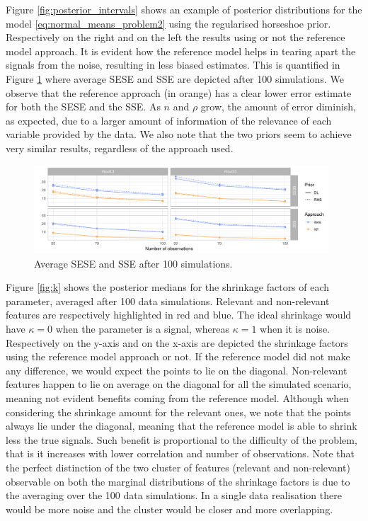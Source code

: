 \documentclass[american,]{article}
\theoremstyle{definition}
\begin{document}
Figure \ref{fig:posterior_intervals} shows an example of posterior distributions for the model \eqref{eq:normal_means_problem2} using the regularised horseshoe prior. Respectively on the right and on the left the results using or not the reference model approach. It is evident how the reference model helps in tearing apart the signals from the noise, resulting in less biased estimates. This is quantified in Figure \ref{fig:SESE_SSE} where average SESE and SSE are depicted after 100 simulations. We observe that the reference approach (in orange) has a clear lower error estimate for both the SESE and the SSE. As $n$ and $\rho$ grow, the amount of error diminish, as expected, due to a larger amount of information of the relevance of each variable provided by the data. We also note that the two priors seem to achieve very similar results, regardless of the approach used.

\begin{figure}[tp]
  \centering
  \includegraphics[width=0.98\textwidth]{graphics/SESE_SSE.pdf}
  \caption{Average SESE and SSE after 100 simulations.\\}
  \label{fig:SESE_SSE}
\end{figure}

Figure \ref{fig:k} shows the posterior medians for the shrinkage factors of each parameter, averaged after 100 data simulations. Relevant and non-relevant features are respectively highlighted in red and blue. The ideal shrinkage would have $\kappa=0$ when the parameter is a signal, whereas $\kappa=1$ when it is noise. Respectively on the y-axis and on the x-axis are depicted the shrinkage factors using the reference model approach or not. If the reference model did not make any difference, we would expect the points to lie on the diagonal. Non-relevant features happen to lie on average on the diagonal for all the simulated scenario, meaning not evident benefits coming from the reference model. Although when considering the shrinkage amount for the relevant ones, we note that the points always lie under the diagonal, meaning that the reference model is able to shrink less the true signals. Such benefit is proportional to the difficulty of the problem, that is it increases with lower correlation and number of observations. Note that the perfect distinction of the two cluster of features (relevant and non-relevant) observable on both the marginal distributions of the shrinkage factors is due to the averaging over the 100 data simulations. In a single data realisation there would be more noise and the cluster would be closer and more overlapping.
\end{document}
